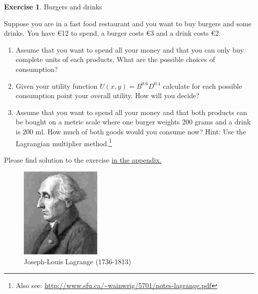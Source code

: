 \documentclass[
  12pt,
  oneside]{book}
\providecommand{\tightlist}{%
  \setlength{\itemsep}{0pt}\setlength{\parskip}{0pt}}
\theoremstyle{definition}
\theoremstyle{definition}
\theoremstyle{definition}
\newtheorem{exercise}{Exercise}[chapter]
\theoremstyle{definition}
\theoremstyle{remark}
\begin{document}
\begin{exercise}
\protect\hypertarget{exr:burgerutility}{}\label{exr:burgerutility}Burgers and drinks

Suppose you are in a fast food restaurant and you want to buy burgers and some drinks. You have €12 to spend, a burger costs €3 and a drink costs €2.

\begin{enumerate}
\def\labelenumi{\alph{enumi})}
\tightlist
\item
  Assume that you want to spend all your money and that you can only buy complete units of each products. What are the possible choices of consumption?
\item
  Given your utility function \(U(x,y)=B^{0.6}D^{0.4}\) calculate for each possible consumption point your overall utility. How will you decide?
\item
  Assume that you want to spend all your money and that both products can be bought on a metric scale where one burger weights 200 grams and a drink is 200 ml. How much of both goods would you consume now? Hint: Use the Lagrangian multiplier method.\footnote{Also see: \url{http://www.sfu.ca/~wainwrig/5701/notes-lagrange.pdf}}
\end{enumerate}

Please find solution to the exercise \protect\hyperlink{sol:burgerutility}{in the appendix.}
\end{exercise}

\begin{figure}
\centering
\includegraphics[width=0.35\textwidth,height=\textheight]{fig/Lagrange.jpg}
\caption[\label{fig:Lagrange} Joseph-Louis Lagrange (1736-1813)]{\label{fig:Lagrange} Joseph-Louis Lagrange (1736-1813)\footnotemark{}}
\end{figure}
\end{document}
